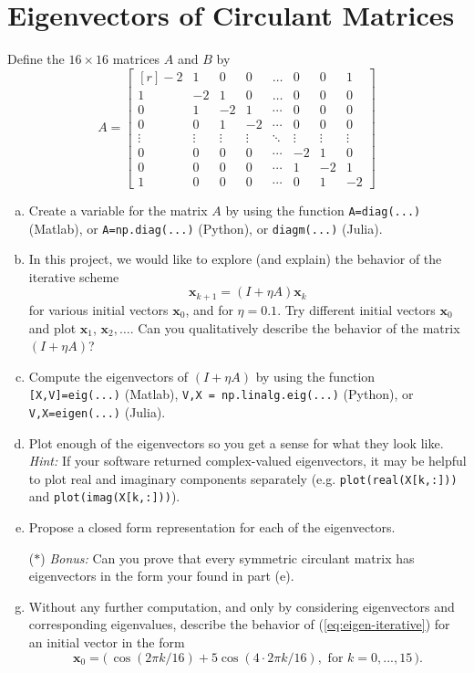 \section{Eigenvectors of Circulant Matrices}


Define the $16 \times 16$ matrices $A$ and $B$ by
\begin{equation}
A = \begin{bmatrix*}[r] -2 & 1 & 0 & 0 & \dots & 0 & 0 & 1 \\ 1 & -2 & 1 & 0 & \dots& 0 & 0 & 0 \\ 0 & 1 & -2 & 1 & \cdots&0 & 0 & 0 \\ 0 & 0 & 1 & -2 & \cdots&0 & 0 & 0 \\ \vdots & \vdots & \vdots & \vdots & \ddots & \vdots & \vdots & \vdots \\ 0 & 0 & 0 & 0 & \cdots & -2 & 1 & 0 \\ 0 & 0 & 0 & 0 & \cdots & 1 & -2 & 1\\ 1 & 0 & 0 & 0 & \cdots & 0 & 1 & -2 \end{bmatrix*}
\end{equation}
\begin{enumerate}[(a)]
  \item Create a variable for the matrix $A$ by using the function \texttt{A=diag(...)} (Matlab), or \texttt{A=np.diag(...)} (Python), or \texttt{diagm(...)} (Julia).
  \item In this project, we would like to explore (and explain) the behavior of the iterative scheme
    \begin{equation}
      \label{eq:eigen-iterative}
      \bm{x}_{k+1} = \left(I + \eta A\right) \bm{x}_{k}
    \end{equation}
   for various initial vectors $\bm{x}_0$, and for $\eta = 0.1$. Try different initial vectors $\bm{x}_0$ and plot $\bm{x}_1$, $\bm{x}_2, \dots $. Can you qualitatively describe the behavior of the matrix $(I + \eta A)$? 
  \item Compute the eigenvectors of $(I+\eta A)$ by using the function \texttt{[X,V]=eig(...)} (Matlab), \texttt{V,X = np.linalg.eig(...)} (Python), or \texttt{V,X=eigen(...)} (Julia).
  \item \sloppy Plot enough of the eigenvectors so you get a sense for what they look like.\\ \textit{Hint:} If your software returned complex-valued eigenvectors, it may be helpful to plot real and imaginary components separately (e.g. \texttt{plot(real(X[k,:]))} and \texttt{plot(imag(X[k,:]))}). 
  \item Propose a closed form representation for each of the eigenvectors.
  \item[($\ast$)] \textit{Bonus:} Can you prove that every symmetric circulant matrix has eigenvectors in the form your found in part (e).
  \item Without any further computation, and only by considering eigenvectors and corresponding eigenvalues, describe the behavior of (\ref{eq:eigen-iterative}) for an initial vector in the form
\begin{equation*}
\bm{x}_0 = \big(\, \cos(2\pi k / 16) + 5 \cos( 4 \cdot 2\pi k / 16), \text{ for } k = 0,...,15\,\big).
\end{equation*}
\end{enumerate}
